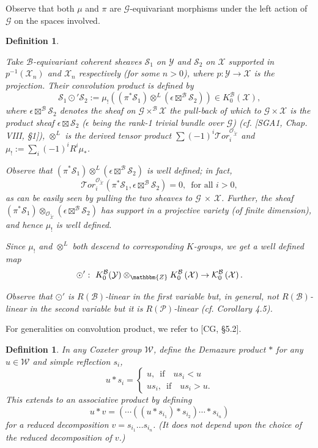 \documentclass{article}
\newtheorem{definition}[theorem]{Definition}
\def\G{\mathcal{G}}
\def\P{\mathcal{P}}
\def\X{\mathcal{X}}
\def\B{\mathcal{B}}
\def\W{\mathcal{W}}
\def\Y{\mathcal{Y}}
\def\cite#1{#1}
\def\K{\mathcal{K}}
\def\ref#1{#1}
\def\Tor{\rm{Tor}}
\def\Tor{\mathcal{T}or}
\begin{document}
Observe that both $\mu$ and $\pi$ are $\G$-equivariant morphisms under the left action of $\G$ on the spaces involved.
\begin{definition}\label{4.1} \rm{
Take $\B$-equivariant coherent sheaves $\mathcal{S}_1$ on $\Y$ and $\mathcal{S}_2$ on $\X$ supported in $p^{-1}(\X_n)$ and $\X_n$  respectively (for some $n>0$), where $p:\Y \rightarrow \X$ is the projection. Their {\it convolution product} is defined by 
$$
\mathcal{S}_1 \odot' \mathcal{S}_2 := \mu_! \left( \left( \pi^* \mathcal{S}_1\right) \otimes^L \left( \epsilon \boxtimes^{\B}\mathcal{S}_2\right)\right) \in K_0^\B \left(\X\right),
$$
where $\epsilon \boxtimes^{\B}\mathcal{S}_2$ denotes the sheaf on $\G\times^{\B} \X$ the pull-back of which to $\G \times \X$ is the product sheaf $\epsilon \boxtimes\mathcal{S}_2$ 
($\epsilon$ being the rank-1 trivial bundle over $\G$) (cf. [\cite{SGA1},  Chap. VIII, \S1]),
 $\otimes^L$ is the derived tensor product $\sum(-1)^i \Tor_i^{\mathcal{O}_{\tilde{\X}}}$ and $\mu_! :=\sum_i (-1)^i R^i \mu_*$. 


Observe that $\left(\pi^* \mathcal{S}_1\right) \otimes^L \left(\epsilon \boxtimes^{\B}\mathcal{S}_2\right) $ is well defined; in fact, 
 \begin{equation} \label{4.1.1}\Tor_i^{\mathcal{O}_{\tilde{\X}}} 
 \left(\pi^* \mathcal{S}_1,\epsilon \boxtimes^{\B}\mathcal{S}_2\right)=0, \,\,\,\text{for all $i>0$},
 \end{equation}
  as can be easily seen by pulling the two sheaves to $\G$ $\times$ $\X$. 
Further, the sheaf $\left(\pi^* \mathcal{S}_1\right) \otimes_{\mathcal{O}_{\tilde{\X}}}
 \left(\epsilon \boxtimes^{\B}\mathcal{S}_2\right) $ has support in a projective variety (of finite dimension), and hence $\mu_!$ is well defined. 

Since $\mu_!$ and $\otimes^L$ both descend to corresponding $K$-groups, we get a well defined map
$$
\odot ': ~ K_0^\B(\Y) \otimes _\mathbbm{Z} K_0^\B \left(\X\right) \rightarrow \K_0^\B \left(\X\right). 
$$

Observe that $\odot '$ is $R(\B)$-linear in the first variable but, in general, {\it not} $R(\B)$-linear in the second variable but it is $R(\P)$-linear (cf. Corollary \ref{4.5}). }
\end{definition}

For generalities on convolution product, we refer to [\cite{CG}, \S5.2]. 
\begin{definition}\label{4.2}
\rm{
In any Coxeter group $\W$,  define the {\it Demazure product} $*$ for any $u\in \W$ and simple reflection $s_i$,
$$
u* s_i=
\left\{ \begin{array}{l}
u,\,\,\,  \mbox{if}\quad us_i <u\\
us_i,\,\,\, \mbox{if}\quad us_i >u.
\end{array}\right.
$$
This extends to an associative product by defining 
$$u*v= (\cdots (( u*s_{i_1})*s_{i_2})\cdots *s_{i_n})$$
 for a reduced decomposition $v=s_{i_1}\ldots s_{i_n}$. (It does not depend upon the choice of the reduced decomposition of $v$.)}
\end{definition}
\end{document}
